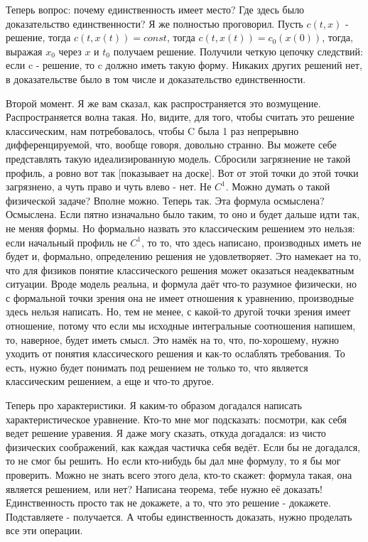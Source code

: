 Теперь вопрос: почему единственность имеет место? Где здесь было доказательство единственности? Я же полностью проговорил. Пусть $c(t,x)$ - решение, тогда $c(t,x(t)) = const$, тогда $c(t,x(t)) = c_0(x(0))$, тогда, выражая $x_0$ через $x$ и $t_0$ получаем решение. Получили четкую цепочку следствий: если c - решение, то c должно иметь такую форму. Никаких других решений нет, в доказательстве было в том числе и доказательство единственности.

Второй момент. Я же вам сказал, как распространяется это возмущение. Распространяется волна такая. Но, видите, для того, чтобы считать это решение классическим, нам потребовалось, чтобы C была 1 раз непрерывно дифференцируемой, что, вообще говоря, довольно странно. Вы можете себе представлять такую идеализированную модель. Сбросили загрязнение не такой профиль, а ровно вот так [показывает на доске]. Вот от этой точки до этой точки загрязнено, а чуть право и чуть влево - нет. Не $C^1$. Можно думать о такой физической задаче? Вполне можно. Теперь так. Эта формула осмыслена? Осмыслена. Если пятно изначально было таким, то оно и будет дальше идти так, не меняя формы. Но формально назвать это классическим решением это нельзя: если начальный профиль не $C^1$, то то, что здесь написано, производных иметь не будет и, формально, определению решения не удовлетворяет. Это намекает на то, что для физиков понятие классического решения может оказаться неадекватным ситуации. Вроде модель реальна, и формула даёт что-то разумное физически, но с формальной точки зрения она не имеет отношения к уравнению, производные здесь нельзя написать. Но, тем не менее, с какой-то другой точки зрения имеет отношение, потому что если мы исходные интегральные соотношения напишем, то, наверное, будет иметь смысл. Это намёк на то, что, по-хорошему, нужно уходить от понятия классического решения и как-то ослаблять требования. То есть, нужно будет понимать под решением не только то, что является классическим решением, а еще и что-то другое.

Теперь про характеристики. Я каким-то образом догадался написать характеристическое уравнение. Кто-то мне мог подсказать: посмотри, как себя ведет решение уравения. Я даже могу сказать, откуда догадался: из чисто физических соображений, как каждая частичка себя ведёт. Если бы не догадался, то не смог бы решить. Но если кто-нибудь бы дал мне формулу, то я бы мог проверить. Можно не знать всего этого дела, кто-то скажет: формула такая, она является решением, или нет? Написана теорема, тебе нужно её доказать! Единственность просто так не докажете, а то, что это решение - докажете. Подставляете - получается. А чтобы единственность доказать, нужно проделать все эти операции.

